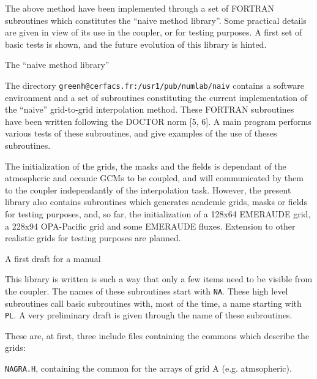 The above method have been implemented through a set of FORTRAN subroutines
which constitutes the  ``naive method library''. Some practical details 
are given in view of its use in the  coupler, or for testing purposes.
 A first set of basic tests
is shown, and the future evolution of this library is hinted. 



 The ``naive method library''

The directory
 {\tt greenh@cerfacs.fr:/usr1/pub/numlab/naiv} contains a software
environment and a set of subroutines constituting the current
implementation of the ``naive'' grid-to-grid interpolation method.  These
FORTRAN subroutines have been written following the DOCTOR norm [5, 6].
A main program performs various tests of these subroutines, and give
examples of the use of theses subroutines.  



\bigskip



The initialization of the grids, the masks and the fields is dependant of the
atmospheric and oceanic GCMs to be coupled, and will communicated by
them to the coupler independantly of the interpolation task. However, the
present library also contains subroutines which generates academic grids,
masks or fields for testing purposes, and, so far, the initialization of a
128x64 EMERAUDE grid, a 228x94 OPA-Pacific grid and some EMERAUDE
fluxes. Extension to other realistic grids for testing purposes are planned. 


 A first draft for a manual 

 This library is written is such a way that  only a few items
need to be visible from the coupler. The names of these subroutines 
start with {\tt NA}. These high level subroutines call basic subroutines
with, most of the time, 
a name starting with  {\tt PL}.
A very preliminary draft is given through the name of these
subroutines.


\medskip
\medskip
{} 
 \medskip

These are, at first, three include files containing the commons which
describe the grids:



\medskip

\item{}{\tt NAGRA.H}, containing the common for the arrays of grid A (e.g.
atmsopheric). 



